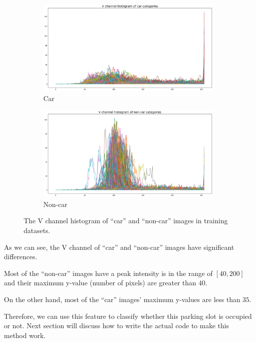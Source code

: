 \documentclass{article}[12pt]
\begin{document}
\begin{figure}[H]
    \centering
    \begin{subfigure}[b]{0.45\textwidth}
        \centering
        \includegraphics[width=\textwidth]{figure/V_car.png}
        \caption{Car}
    \end{subfigure}
    \hfill
    \begin{subfigure}[b]{0.45\textwidth}
        \centering
        \includegraphics[width=\textwidth]{figure/V_noncar.png}
        \caption{Non-car}
    \end{subfigure}
    \caption{The V channel histogram of ``car'' and ``non-car'' images in training datasets.}
    \label{fig:hsv_v}
\end{figure}

As we can see, the V channel of ``car'' and ``non-car'' images have significant differences. 

Most of the ``non-car'' images have a peak intensity is in the range of $[40, 200]$ and their maximum y-value 
(number of pixels) are greater than $40$.

On the other hand, most of the ``car'' images' maximum y-values are less than $35$.

Therefore, we can use this feature to classify whether this parking slot is occupied or not. 
Next section will discuss how to write the actual code to make this method work.
\end{document}
